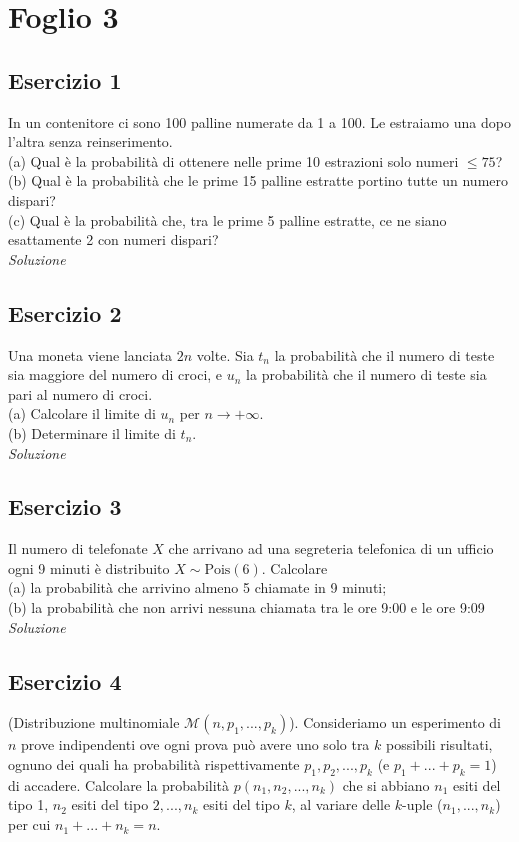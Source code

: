 \section{Foglio 3}
\subsection{Esercizio 1}
In un contenitore ci sono 100 palline numerate da 1 a 100. Le estraiamo una dopo l’altra senza reinserimento. \\
(a) Qual è la probabilità di ottenere nelle prime 10 estrazioni solo numeri $\leq  75$? \\
(b) Qual è la probabilità che le prime 15 palline estratte portino tutte un numero dispari? \\
(c) Qual è la probabilità che, tra le prime 5 palline estratte, ce ne siano esattamente 2 con numeri
dispari?
\\

\textit{Soluzione}

\subsection{Esercizio 2}
Una moneta viene lanciata $2n$ volte. Sia $t_n$ la probabilità che il numero di teste sia maggiore del numero di croci, e $u_n$ la probabilità che il numero di teste sia pari al numero di croci.\\
(a) Calcolare il limite di $u_n$ per $n \to +\infty$. \\
(b) Determinare il limite di $t_n$.
\\

\textit{Soluzione}

\subsection{Esercizio 3}
Il numero di telefonate $X $ che arrivano ad una segreteria telefonica di un ufficio ogni 9 minuti è
distribuito $X \sim \text{Pois}(6)$. Calcolare \\
(a) la probabilità che arrivino almeno 5 chiamate in 9 minuti; \\
(b) la probabilità che non arrivi nessuna chiamata tra le ore 9:00 e le ore 9:09
\\

\textit{Soluzione}

\subsection{Esercizio 4}
(Distribuzione multinomiale $\mathcal M(n, p_1 ,...,p_k)$). Consideriamo un esperimento di $n$ prove indipendenti ove ogni prova può avere uno solo tra $k$ possibili risultati, ognuno dei quali ha probabilità rispettivamente $p_1 ,p_2 ,...,p_k$ (e $p_1 +...+p_k = 1$) di accadere. Calcolare la probabilità $p(n_1 ,n_2 ,...,n_k )$ che si abbiano $n_1$ esiti del tipo 1, $n_2$ esiti del tipo $2, ... , n_k$ esiti del tipo $k$, al variare delle $k$-uple ($n_1 ,...,n_k $) per cui $n_1 +...+n_k =n$.
\\

